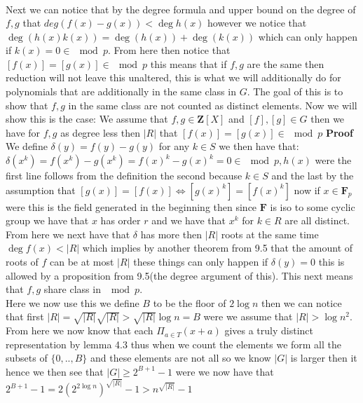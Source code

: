 \begin{enumerate}
\begin{equation}
\begin{split}
    \end{split}
\end{equation}
Next we can notice that by the degree formula and upper bound on the degree of $f,g$ that $deg(f(x)-g(x))<\deg h(x)$ however we notice that $\deg(h(x)k(x))=\deg(h(x))+\deg(k(x))$ which can only happen if $k(x)=0\in \mod{p}$. From here then notice that $[f(x)]=[g(x)]\in \mod{p}$ this means that if $f,g$ are the same then reduction will not leave this unaltered, this is what we will additionally do for polynomials that are additionally in the same class in $G$. The goal of this is to show that $f,g $ in the same class are not counted as distinct elements. Now we will show this is the case:
We assume that $f,g\in \mathbf{Z}[X]$ and $[f],[g]\in G$ then we have for $f,g$ as degree less then $|R|$ that $[f(x)]=[g(x)]\in \mod{p}$
\textbf{Proof} We define $\delta(y) = f(y)-g(y)$ for any $k\in S$ we then have that: $\delta(x^k)= f(x^k)-g(x^k)=f(x)^k-g(x)^k=0\in \mod{p,h(x)}$ were the first line follows from the definition the second because $k\in S$ and the last by the assumption that $[g(x)]=[f(x)]\iff [g(x)^k]=[f(x)^k] $ now if $x\in \mathbf{F}_p$ were this is the field generated in the beginning then since $\mathbf{F}$ is iso to some cyclic group we have that $x$ has order $r$ and we have that $x^k$ for $k\in R$ are all distinct. From here we next have that $\delta$ has more then $|R|$ roots at the same time $\deg{f(x)}<|R|$ which implies by another theorem from 9.5 that the amount of roots of $f$ can be at most $|R|$ these things can only happen if $\delta(y) = 0$ this is allowed by a proposition from 9.5(the degree argument of this). This next means that $f,g$ share class in $\mod{p}$.\\ Here we now use this we define $B$ to be the floor of $2\log{n}$ then we can notice that first $|R|=\sqrt{|R|}\sqrt{|R|}>\sqrt{|R|}\log{n}=B$ were we assume that $|R|>\log{n}^2$. From here we now know that each $\Pi_{a\in T}(x+a)$ gives a truly distinct representation by lemma 4.3 thus when we count the elements we form all the subsets of $\{0,..,B\}$ and these elements are not all so we know $|G|$ is larger then it hence we then see that $|G|\ge 2^{B+1}-1$ were we now have that $2^{B+1}-1=2(2^{2\log{n}})^\sqrt{|R|}-1>n^{\sqrt{|R|}}-1$

\end{enumerate}